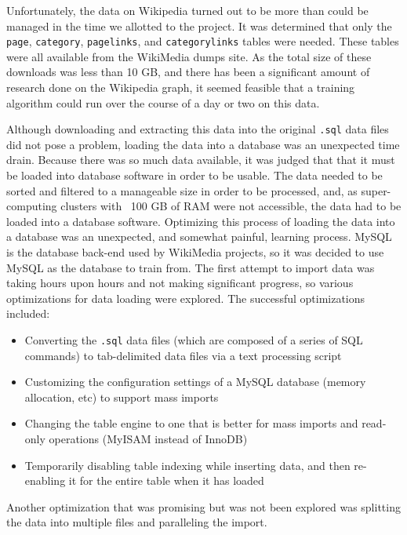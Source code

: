 
Unfortunately, the data on Wikipedia turned out to be more than could be managed
in the time we allotted to the project. It was determined that only the
\texttt{page}, \texttt{category}, \texttt{pagelinks}, and \texttt{categorylinks}
tables were needed. These tables were all available from the WikiMedia dumps
site. As the total size of these downloads was less than 10 GB, and there has
been a significant amount of research done on the Wikipedia graph, it seemed
feasible that a training algorithm could run over the course of a day or two on
this data.

Although downloading and extracting this data into the original \texttt{.sql}
data files did not pose a problem, loading the data into a database was an
unexpected time drain. Because there was so much data available, it was judged
that that it must be loaded into database software in order to be usable. The
data needed to be sorted and filtered to a manageable size in order to be
processed, and, as super-computing clusters with ~100 GB of RAM were not
accessible, the data had to be loaded into a database software. Optimizing this
process of loading the data into a database was an unexpected, and somewhat
painful, learning process. MySQL is the database back-end used by WikiMedia
projects, so it was decided to use MySQL as the database to train from. The
first attempt to import data was taking hours upon hours and not making
significant progress, so various optimizations for data loading were explored.
The successful optimizations included:

\begin{itemize}
\item Converting the \texttt{.sql} data files (which are composed of a series of
  SQL commands) to tab-delimited data files via a text processing script
\item Customizing the configuration settings of a MySQL database (memory
  allocation, etc) to support mass imports
\item Changing the table engine to one that is better for mass imports and
  read-only operations (MyISAM instead of InnoDB)
\item Temporarily disabling table indexing while inserting data, and then
  re-enabling it for the entire table when it has loaded
\end{itemize}

Another optimization that was promising but was not been explored was splitting
the data into multiple files and paralleling the import.

